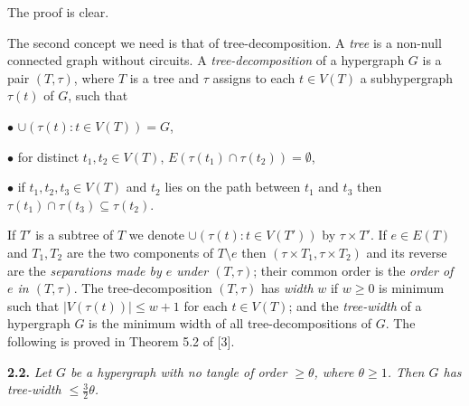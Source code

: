 The proof is clear. 

The second concept we need is that of tree-decomposition. A \textit{tree} is a non-null connected graph without circuits. A \textit{tree-decomposition} of a hypergraph $G$ is a pair $(T, \tau)$, where $T$ is a tree and $\tau$ assigns to each $t \in V(T)$ a subhypergraph $\tau(t)$ of $G$, such that

\hspace*{12pt}$\bullet$ $\cup(\tau(t): t \in V(T)) = G$,

\hspace*{12pt}$\bullet$ for distinct $t_1, t_2 \in V(T)$, $E(\tau(t_1) \cap \tau(t_2)) = \emptyset$,

\hspace*{12pt}$\bullet$ if $t_1, t_2, t_3 \in V(T)$ and $t_2$ lies on the path between $t_1$ and $t_3$ then $\tau(t_1) \cap \tau(t_3) \subseteq \tau(t_2)$.

If $T'$ is a subtree of $T$ we denote $\cup(\tau(t): t \in V(T'))$ by $\tau \times T'$. If $e \in E(T)$ and $T_1, T_2$ are the two components of $T \setminus e$ then $(\tau \times T_1, \tau \times T_2)$ and its reverse are the \textit{separations made by $e$ under $(T, \tau)$}; their common order is the \textit{order of $e$ in $(T, \tau)$}. The tree-decomposition $(T, \tau)$ has \textit{width} $w$ if $w \ge 0$ is minimum such that $|V(\tau(t))| \le w + 1$ for each $t \in V(T)$; and the \textit{tree-width} of a hypergraph $G$ is the minimum width of all tree-decompositions of $G$. The following is proved in Theorem 5.2 of [3].

\textbf{2.2.} \textit{Let $G$ be a hypergraph with no tangle of order $\ge \theta$, where $\theta \ge 1$. Then $G$ has tree-width $\le \frac{3}{2}\theta$.}
